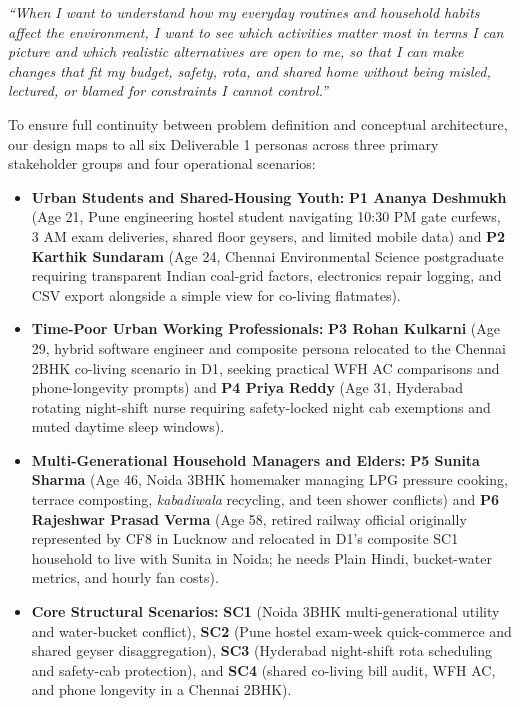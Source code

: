 \documentclass[12pt, a4paper]{article}
\begin{document}
\begin{tcolorbox}[colback=BgLight, colframe=AcademicNavy, boxrule=0.7pt, arc=2pt, left=10pt, right=10pt, top=6pt, bottom=6pt]
\textit{``When I want to understand how my everyday routines and household habits affect the environment, I want to see which activities matter most in terms I can picture and which realistic alternatives are open to me, so that I can make changes that fit my budget, safety, rota, and shared home without being misled, lectured, or blamed for constraints I cannot control.''}
\end{tcolorbox}

To ensure full continuity between problem definition and conceptual architecture, our design maps to all six Deliverable 1 personas across three primary stakeholder groups and four operational scenarios:
\begin{itemize}
    \item \textbf{Urban Students and Shared-Housing Youth:} \textbf{P1 Ananya Deshmukh} (Age 21, Pune engineering hostel student navigating 10:30 PM gate curfews, 3 AM exam deliveries, shared floor geysers, and limited mobile data) and \textbf{P2 Karthik Sundaram} (Age 24, Chennai Environmental Science postgraduate requiring transparent Indian coal-grid factors, electronics repair logging, and CSV export alongside a simple view for co-living flatmates).
    \item \textbf{Time-Poor Urban Working Professionals:} \textbf{P3 Rohan Kulkarni} (Age 29, hybrid software engineer and composite persona relocated to the Chennai 2BHK co-living scenario in D1, seeking practical WFH AC comparisons and phone-longevity prompts) and \textbf{P4 Priya Reddy} (Age 31, Hyderabad rotating night-shift nurse requiring safety-locked night cab exemptions and muted daytime sleep windows).
    \item \textbf{Multi-Generational Household Managers and Elders:} \textbf{P5 Sunita Sharma} (Age 46, Noida 3BHK homemaker managing LPG pressure cooking, terrace composting, \textit{kabadiwala} recycling, and teen shower conflicts) and \textbf{P6 Rajeshwar Prasad Verma} (Age 58, retired railway official originally represented by CF8 in Lucknow and relocated in D1’s composite SC1 household to live with Sunita in Noida; he needs Plain Hindi, bucket-water metrics, and hourly fan costs).
    \item \textbf{Core Structural Scenarios:} \textbf{SC1} (Noida 3BHK multi-generational utility and water-bucket conflict), \textbf{SC2} (Pune hostel exam-week quick-commerce and shared geyser disaggregation), \textbf{SC3} (Hyderabad night-shift rota scheduling and safety-cab protection), and \textbf{SC4} (shared co-living bill audit, WFH AC, and phone longevity in a Chennai 2BHK).
\end{itemize}
\end{document}

